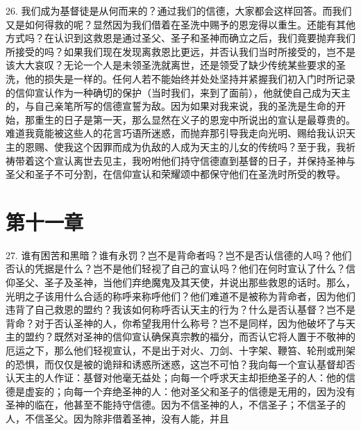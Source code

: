 26. 我们成为基督徒是从何而来的？通过我们的信德，大家都会这样回答。而我们又是如何得救的呢？显然因为我们借着在圣洗中赐予的恩宠得以重生。还能有其他方式吗？在认识到这救恩是通过圣父、圣子和圣神而确立之后，我们竟要抛弃我们所接受的吗？如果我们现在发现离救恩比更远，并否认我们当时所接受的，岂不是该大大哀叹？无论一个人是未领圣洗就离世，还是领受了缺少传统某些要求的圣洗，他的损失是一样的。任何人若不能始终并处处坚持并紧握我们初入门时所记录的信仰宣认作为一种确切的保护（当时我们，来到了面前），他就使自己成为天主的，与自己亲笔所写的信德宣誓为敌。因为如果对我来说，我的圣洗是生命的开始，那重生的日子是第一天，那么显然在义子的恩宠中所说出的宣认是最尊贵的。难道我竟能被这些人的花言巧语所迷惑，而抛弃那引导我走向光明、赐给我认识天主的恩赐、使我这个因罪而成为仇敌的人成为天主的儿女的传统吗？至于我，我祈祷带着这个宣认离世去见主，我吩咐他们持守信德直到基督的日子，并保持圣神与圣父和圣子不可分割，在信仰宣认和荣耀颂中都保守他们在圣洗时所受的教导。\par


\section{第十一章}

\par

27.  谁有困苦和黑暗？谁有永罚？岂不是背命者吗？岂不是否认信德的人吗？他们否认的凭据是什么？岂不是他们轻视了自己的宣认吗？他们在何时宣认了什么？信仰圣父、圣子及圣神，当他们弃绝魔鬼及其天使，并说出那些救恩的话时。那么，光明之子该用什么合适的称呼来称呼他们？他们难道不是被称为背命者，因为他们违背了自己救恩的盟约？我该如何称呼否认天主的行为？什么是否认基督？岂不是背命？对于否认圣神的人，你希望我用什么称号？岂不是同样，因为他破坏了与天主的盟约？既然对圣神的信仰宣认确保真宗教的福分，而否认它将人置于不敬神的厄运之下，那么他们轻视宣认，不是出于对火、刀剑、十字架、鞭笞、轮刑或刑架的恐惧，而仅仅是被的诡辩和诱惑所迷惑，这岂不可怕？我向每一个宣认基督却否认天主的人作证：基督对他毫无益处；向每一个呼求天主却拒绝圣子的人：他的信德是虚妄的；向每一个弃绝圣神的人：他对圣父和圣子的信德是无用的，因为没有圣神的临在，他甚至不能持守信德。因为不信圣神的人，不信圣子；不信圣子的人，不信圣父。因为除非借着圣神，没有人能，并且\par

